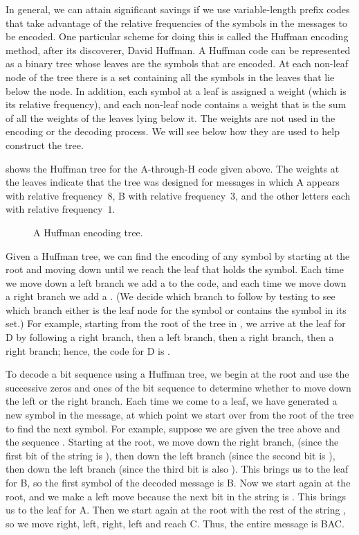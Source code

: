 In general, we can attain significant savings if we use variable-length prefix codes that take advantage of the relative frequencies of the symbols in the messages to be encoded.
One particular scheme for doing this is called the Huffman encoding method, after its discoverer, David Huffman.
A Huffman code can be represented as a binary tree whose leaves are the symbols that are encoded.
At each non-leaf node of the tree there is a set containing all the symbols in the leaves that lie below the node.
In addition, each symbol at a leaf is assigned a weight (which is its relative frequency), and each non-leaf node contains a weight that is the sum of all the weights of the leaves lying below it.
The weights are not used in the encoding or the decoding process.
We will see below how they are used to help construct the tree.

 shows the Huffman tree for the A-through-H code given above.
The weights at the leaves indicate that the tree was designed for messages in which A appears with relative frequency~\( 8 \), B with relative frequency~\( 3 \), and the other letters each with relative frequency~\( 1 \).

\begin{figure}[tb]
	\centering
	
	\caption{
		A Huffman encoding tree.
	}
	\label{Figure 2.18}
\end{figure}

Given a Huffman tree, we can find the encoding of any symbol by starting at the root and moving down until we reach the leaf that holds the symbol.
Each time we move down a left branch we add a  to the code, and each time we move down a right branch we add a .
(We decide which branch to follow by testing to see which branch either is the leaf node for the symbol or contains the symbol in its set.)
For example, starting from the root of the tree in , we arrive at the leaf for D by following a right branch, then a left branch, then a right branch, then a right branch;
hence, the code for D is .

To decode a bit sequence using a Huffman tree, we begin at the root and use the successive zeros and ones of the bit sequence to determine whether to move down the left or the right branch.
Each time we come to a leaf, we have generated a new symbol in the message, at which point we start over from the root of the tree to find the next symbol.
For example, suppose we are given the tree above and the sequence .
Starting at the root, we move down the right branch, (since the first bit of the string is ), then down the left branch (since the second bit is ), then down the left branch (since the third bit is also ).
This brings us to the leaf for B, so the first symbol of the decoded message is B.
Now we start again at the root, and we make a left move because the next bit in the string is .
This brings us to the leaf for A.
Then we start again at the root with the rest of the string , so we move right, left, right, left and reach C.
Thus, the entire message is BAC.



